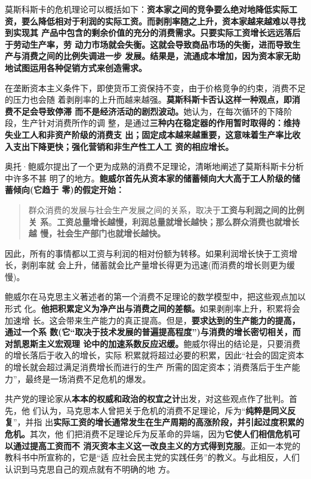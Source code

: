 莫斯科斯卡的危机理论可以概括如下：\textbf{资本家之间的竞争要么绝对地降低实际工
资，要么降低相对于利润的实际工资。而剥削率随之上升，资本家越来越难以寻找到实现其
产品中包含的剩余价值的充分的消费需求。只要实际工资增长远远落后于劳动生产率，劳
动力市场就会失衡。这就会导致商品市场的失衡，进而导致生产与消费之间的比例失调进一步
发展。结果是，流通成本增加，因为资本家无助地试图运用各种促销方式来创造需求。}

在垄断资本主义条件下，即使货币工资保持不变，由于价格竞争的约束，消费不足的压力也会随
着剥削率的上升而越来越强。\textbf{莫斯科斯卡否认这样一种观点，即消费不足会导致停滞
而不是经济活动的剧烈波动。}她认为，在每次循环的下降阶段，生产针对消费所作的调
整，是通过\textbf{三种内在稳定器的作用暂时取得的：维持失业工人和非资产阶级的消费支
出；固定成本越来越重要，这意味着生产率比收入支出下降更快；强化营销和非生产性工人工
资的相应增长。}

奥托·鲍威尔提出了一个更为成熟的消费不足理论，清晰地阐述了莫斯科斯卡分析中许多不甚
明了的地方。\textbf{鲍威尔首先从资本家的储蓄倾向大大高于工人阶级的储蓄倾向(它趋于
零)的假定开始：}
\begin{quotation}
群众消费的发展与社会生产发展之间的关系，取决于\textbf{工资与利润之间的比例关
系}。\textbf{工资总量增长越慢，利润总量就增长越快；那么群众消费也就增长越
慢，社会生产部门也就增长越快。}
\end{quotation}
因此，所有的事情都以工资与利润的相对份额为转移。如果利润增长快于工资增长，剥削率就
会上升，储蓄就会比产量增长得更为迅速(而消费的增长则更为缓慢)。

鲍威尔在马克思主义著述者的第一个消费不足理论的数学模型中，把这些观点加以形式
化。\textbf{他把积累定义为净产出与消费之间的差额。}如果剥削率上升，积累将会加速增
长。这会带来生产能力的真正提高。但是，\textbf{要求达到的生产能力的提高，通过一个系
数(它“取决于技术发展的普遍提高程度”)与消费的增长密切相关，而对凯恩斯主义宏观理
论中的加速系数反应迟缓。}鲍威尔得出的结论是，只要消费的增长落后于收入的增长，实际
积累就将超过必要的积累，因此“社会的固定资本的增长就会超过满足消费增长而进行的生产
所需的固定资本；消费落后于生产能力”，最终是一场消费不足危机的爆发。

共产党的理论家从\textbf{本本的权威和政治的权宜之计}出发，对这些观点作了批判。首先，他
们认为，马克思本人曾把关于危机的消费不足理论，斥为“\textbf{纯粹是同义反复}”，并指
出\textbf{实际工资的增长通常发生在生产周期的高涨阶段，并引起过度积累的危机。}其次，他
们把消费不足理论斥为反革命的异端，因为\textbf{它使人们相信危机可以通过提高工资而不
消灭资本主义这一改良主义的方式得到克服}。正如一本党的教科书中所宣称的，它是“适
应社会民主党的实践任务”的教义。与此相反，人们认识到马克思自己的观点就有不明确的地
方。

